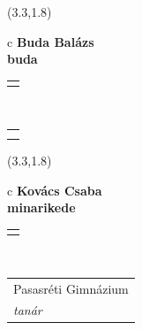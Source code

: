 \documentclass[11pt]{article}
\begin{document}
\makebox(3.3,1.8){
  \renewcommand\arraystretch{1.3}
  \begin{tabular}[c]{c}
    \hspace{8.5mm}
    \LARGE\bf{ Buda Balázs }\\
    \hspace{8.5mm}
    \Large{ buda }\\
    \renewcommand\arraystretch{3}
    \begin{tabular}[c]{c}
      \centering
      \fontfamily{phv}\selectfont{
        \textbf{
          \textsc{
            \scriptsize{
            \color{Bright}{ Ismerkedő }\color{Dark}{ Webmester }\color{Bright}{ Sminkmester }\color{Bright}{ Programozó }
            }
          }
        }
      }
    \end{tabular}
    \\
    \renewcommand\arraystretch{1}
    \begin{tabular}{p{3.3in}}
      \hspace{.7cm}\\
      \hspace{.7cm}\emph{  }\\
    \end{tabular}
  \end{tabular}
}

\makebox(3.3,1.8){
  \renewcommand\arraystretch{1.3}
  \begin{tabular}[c]{c}
    \hspace{8.5mm}
    \LARGE\bf{ Kovács Csaba }\\
    \hspace{8.5mm}
    \Large{ minarikede }\\
    \renewcommand\arraystretch{3}
    \begin{tabular}[c]{c}
      \centering
      \fontfamily{phv}\selectfont{
        \textbf{
          \textsc{
            \scriptsize{
            \color{Bright}{ Ismerkedő }\color{Dark}{ Webmester }\color{Bright}{ Sminkmester }\color{Bright}{ Programozó }
            }
          }
        }
      }
    \end{tabular}
    \\
    \renewcommand\arraystretch{1}
    \begin{tabular}{p{3.3in}}
      \hspace{.7cm}Pasasréti Gimnázium\\
      \hspace{.7cm}\emph{ tanár }\\
    \end{tabular}
  \end{tabular}
}
\end{document}
